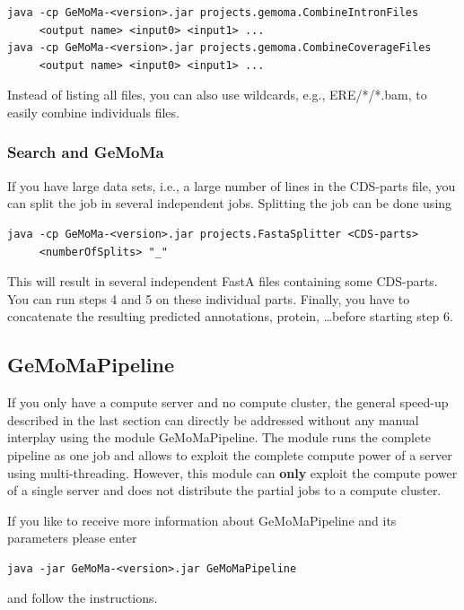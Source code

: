\documentclass{article}
\begin{document}
\begin{verbatim}
java -cp GeMoMa-<version>.jar projects.gemoma.CombineIntronFiles
     <output name> <input0> <input1> ...
java -cp GeMoMa-<version>.jar projects.gemoma.CombineCoverageFiles
     <output name> <input0> <input1> ...
\end{verbatim}

Instead of listing all files, you can also use wildcards, e.g., ERE/*/*.bam, to easily combine individuals files.

\subsubsection{Search and GeMoMa}
If you have large data sets, i.e., a large number of lines in the CDS-parts file, you can split the job in several independent jobs. Splitting the job can be done using
\begin{verbatim}
java -cp GeMoMa-<version>.jar projects.FastaSplitter <CDS-parts> 
     <numberOfSplits> "_"
\end{verbatim}

This will result in several independent FastA files containing some CDS-parts. You can run steps 4 and 5 on these individual parts.
Finally, you have to concatenate the resulting predicted annotations, protein, \ldots before starting step 6.

\subsection{GeMoMaPipeline}
If you only have a compute server and no compute cluster, the general speed-up described in the last section can directly be addressed without any manual interplay using the module GeMoMaPipeline. The module runs the complete pipeline as one job and allows to exploit the complete compute power of a server using multi-threading. 
However, this module can \textbf{only} exploit the compute power of a single server and does not distribute the partial jobs to a compute cluster.

If you like to receive more information about GeMoMaPipeline and its parameters please enter
\begin{verbatim}
java -jar GeMoMa-<version>.jar GeMoMaPipeline
\end{verbatim}
and follow the instructions.
\end{document}
